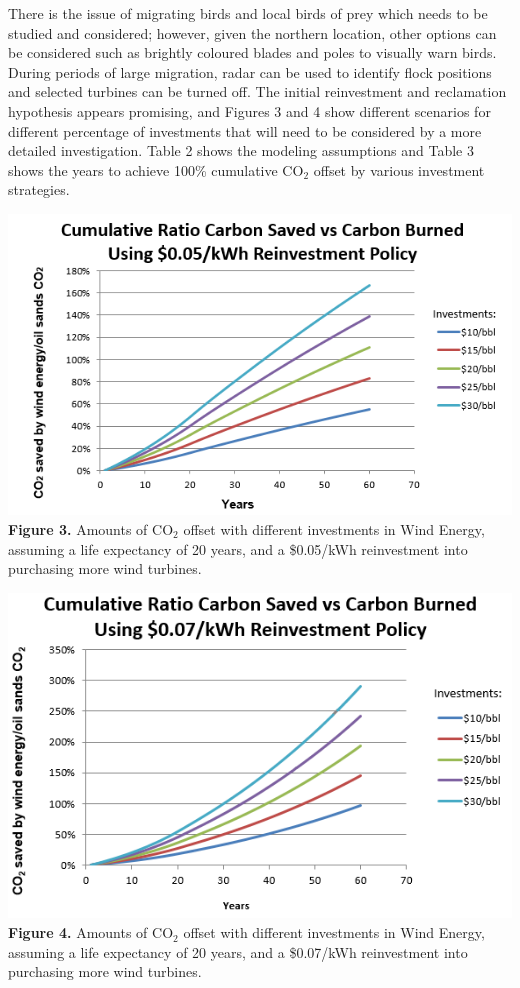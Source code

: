 \documentclass[12pt]{article}
\begin{document}
There is the issue of migrating birds and local birds of prey which needs to be studied and considered; however, given the northern location, other options can be considered such as brightly coloured blades and poles to visually warn birds.  During periods of large migration, radar can be used to identify flock positions and selected turbines can be turned off.
The initial reinvestment and reclamation hypothesis appears promising, and Figures 3 and 4 show different scenarios for different percentage of investments that will need to be considered by a more detailed investigation.  Table 2 shows the modeling assumptions and Table 3 shows the years to achieve 100\% cumulative CO$_2$ offset by various investment strategies.

\begin{center}
\includegraphics{g3.png}
{\bf Figure 3.} Amounts of CO$_2$ offset with different investments in Wind Energy, assuming a life expectancy of 20 years, and a \$0.05/kWh reinvestment into purchasing more wind turbines. 
\end{center}

\begin{center}
\includegraphics{g4.png}
{\bf Figure 4.} Amounts of CO$_2$ offset with different investments in Wind Energy, assuming a life expectancy of 20 years, and a \$0.07/kWh reinvestment into purchasing more wind turbines. 
\end{center}
\end{document}
